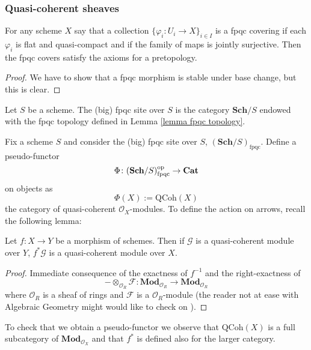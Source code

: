 \subsubsection{Quasi-coherent sheaves}

\begin{lemma} \label{lemma fpqc topology}
For any scheme $X$ say that a collection $\{\varphi_i \colon U_i \to X\}_{i \in I}$ is a fpqc covering if each $\varphi_i$ is flat and quasi-compact and if the family of maps is jointly surjective. Then the fpqc covers satisfy the axioms for a pretopology.
\end{lemma}

\begin{proof}
We have to show that a fpqc morphism is stable under base change, but this is clear.
\end{proof}

\begin{defin}
Let $S$ be a scheme. The (big) fpqc site over $S$ is the category $\mathbf{Sch} / S$ endowed with the fpqc topology defined in Lemma \ref{lemma fpqc topology}.
\end{defin}

Fix a scheme $S$ and consider the (big) fpqc site over $S$, $(\mathbf{Sch}/S)_{\mathrm{fpqc}}$. Define a pseudo-functor
\[
\Phi \colon (\mathbf{Sch}/S)_{\mathrm{fpqc}}^{\mathrm{op}} \to \mathbf{Cat}
\]
on objects as
\[
\Phi(X) := \mathrm{QCoh}(X)
\]
the category of quasi-coherent $\mathcal O_X$-modules. To define the action on arrows, recall the following lemma:

\begin{lemma}
Let $f \colon X \to Y$ be a morphism of schemes. Then if $\mathcal G$ is a quasi-coherent module over $Y$, $f^* \mathcal G$ is a quasi-coherent module over $X$.
\end{lemma}

\begin{proof}
Immediate consequence of the exactness of $f^{-1}$ and the right-exactness of
\[
- \otimes_{\mathcal O_R} \mathcal F \colon \mathbf{Mod}_{\mathcal O_R} \to \mathbf{Mod}_{\mathcal O_R}
\]
where $\mathcal O_R$ is a sheaf of rings and $\mathcal F$ is a $\mathcal O_R$-module (the reader not at ease with Algebraic Geometry might would like to check on \cite[Prop. II.5.8.(a)]{hartshorne}).
\end{proof}

To check that we obtain a pseudo-functor we observe that $\mathrm{QCoh}(X)$ is a full subcategory of $\mathbf{Mod}_{\mathcal O_X}$ and that $f^*$ is defined also for the larger category.


